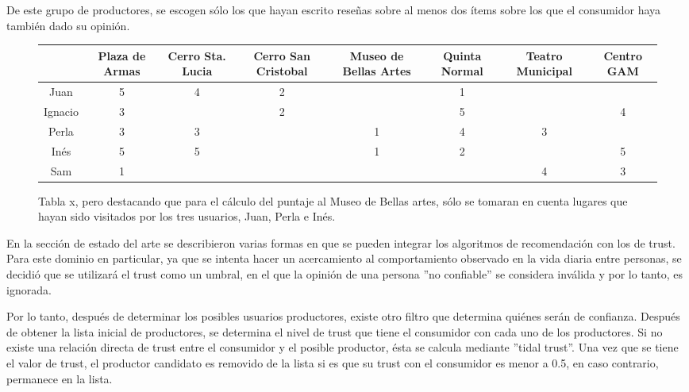 De este grupo de productores, se escogen sólo los que hayan escrito reseñas sobre al menos dos ítems sobre los que el consumidor haya también dado su opinión.
\begin{figure}
\centering
\begin{adjustbox}{max width=\textwidth}
\begin{tabular}{|c|g|g|c|c|g|c|c|}

                  & Plaza de Armas & Cerro Sta. Lucia & Cerro San Cristobal & Museo de Bellas Artes & Quinta Normal  & Teatro Municipal & Centro GAM \\
\hline
Juan          & 5 & 4 & 2 &   & 1 &   &   \\
\hline
{}Ignacio       & 3 &   & 2 &   & 5 &   & 4 \\
\hline
Perla         & 3 & 3 &   & 1 & 4 & 3 &   \\
\hline
Inés          & 5 & 5 &   & 1 & 2 &   & 5 \\
\hline
Sam          & 1 &  &   &  &  & 4  & 3 \\
\hline

\end{tabular}
\end{adjustbox}
\caption{Tabla x, pero destacando que para el cálculo del puntaje al Museo de Bellas artes, sólo se tomaran en cuenta lugares que hayan sido visitados por los tres usuarios, Juan, Perla e Inés.}

\end{figure}


En la sección de estado del arte se describieron varias formas en que se pueden integrar los algoritmos de recomendación con los de trust. Para este dominio en particular, ya que se intenta hacer un acercamiento al comportamiento observado en la vida diaria entre personas, se decidió que se utilizará el trust como un umbral, en el que la opinión de una persona ''no confiable'' se considera inválida y por lo tanto, es ignorada. 

Por lo tanto, después de determinar los posibles usuarios productores, existe otro filtro que determina quiénes serán de confianza. Después de obtener la lista inicial de productores, se determina el nivel de trust que tiene el consumidor con cada uno de los productores. Si no existe una relación directa de trust entre el consumidor y el posible productor, ésta se calcula mediante ''tidal trust''. Una vez que se tiene el valor de trust, el productor candidato es removido de la lista si es que su trust con el consumidor es menor a 0.5, en caso contrario, permanece en la lista. 

